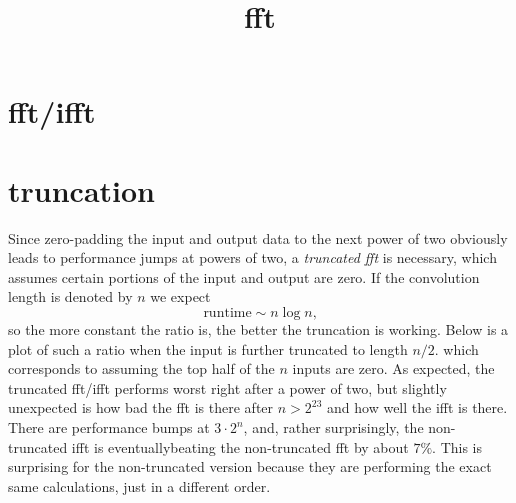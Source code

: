 \documentclass[12 pt]{amsart}
\begin{document}
\title{fft}

\section{fft/ifft}

\section{truncation}

Since zero-padding the input and output data to the next power of two obviously leads to performance jumps at powers of two, a \emph{truncated fft} is necessary, which assumes certain portions of the input and output are zero. If the convolution length is denoted by $n$ we expect
\begin{equation*}
\text{runtime} \sim n \log n\text{,}
\end{equation*}
so the more constant the ratio is, the better the truncation is working. Below is a plot of such a ratio when the input is further truncated to length $n/2$. which corresponds to assuming the top half of the $n$ inputs are zero. As expected, the truncated fft/ifft performs worst right after a power of two, but slightly unexpected is how bad the fft is there after $n>2^{23}$ and how well the ifft is there. There are performance bumps at $3 \cdot 2^n$, and, rather surprisingly, the non-truncated ifft is eventuallybeating the non-truncated fft by about $7\%$. This is surprising for the non-truncated version because they are performing the exact same calculations, just in a different order.
\end{document}
